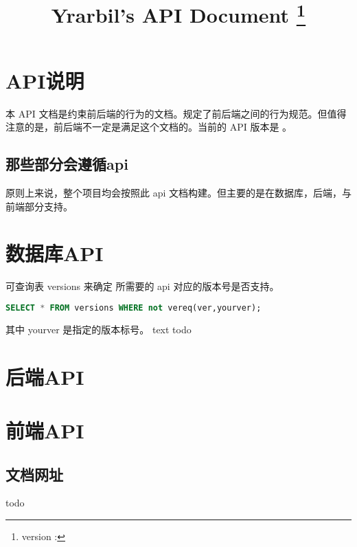 \documentclass[UTF8]{ctexart}
\title{Yrarbil's API Document \thanks{version : \apiver}}
\begin{document}
    \maketitle
    \newpage
    
    \tableofcontents
    \newpage
    \section{API说明}
    本 API 文档是约束前后端的行为的文档。规定了前后端之间的行为规范。但值得注意的是，前后端不一定是满足这个文档的。当前的 API 版本是 \apiver 。
    \subsection{那些部分会遵循api}
    原则上来说，整个项目均会按照此 api 文档构建。但主要的是在数据库，后端，与前端部分支持。
    \section{数据库API}
     可查询表 versions 来确定 所需要的 api 对应的版本号是否支持。
    \begin{lstlisting}[language=SQL]
SELECT * FROM versions WHERE not vereq(ver,yourver);
    \end{lstlisting}
    其中 yourver 是指定的版本标号。
     text todo
    
    \section{后端API}
    \section{前端API}
    \newpage
    \begin{appendices}
    \section{文档网址}
    todo 
    \end{appendices}
    
\end{document}
